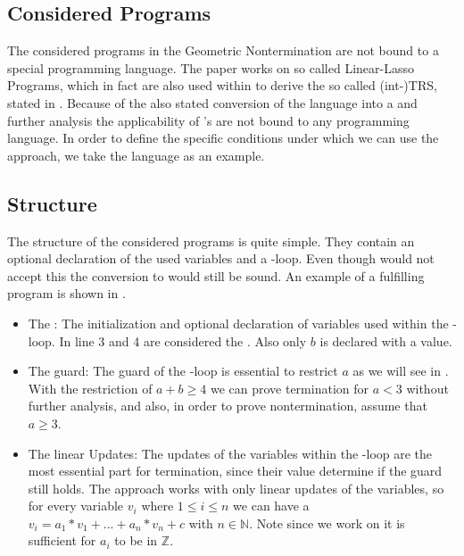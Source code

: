 \subsection{Considered Programs}
The considered programs in the Geometric Nontermination are not bound to a special programming language. The paper works on so called Linear-Lasso Programs, which in fact are also used within \aprove to derive the so called (int-)TRS, stated in . Because of the also stated conversion of the language into a \seg and further analysis the applicability of \gna's are not bound to any programming language. \newline
In order to define the specific conditions under which we can use the approach, we take the language  as an example.
\subsection{Structure}
\label{sec:structure}
The structure of the considered programs is quite simple. They contain an optional declaration of the used variables and a -loop. Even though  would not accept this the conversion to  would still be sound. An example of a fulfilling  program is shown in . 
\begin{itemize}
	\item The \stem: \newline
		The initialization and optional declaration of variables used within the -loop. In  line 3 and 4 are considered the \stem. Also only $b$ is declared with a value.
	\item The guard: \newline
		The guard of the -loop is essential to restrict $a$  as we will see in . With the restriction of $a+b\ge 4 $ we can prove termination for $a < 3$ without further analysis, and also, in order to prove nontermination, assume that $a \ge 3$.
	\item The linear Updates: \newline
		The updates of the variables within the -loop are the most essential part for termination, since their value determine if the guard still holds. The approach works with only linear updates of the variables, so for every variable $v_i$ where $1\le i\le n$ we can have a $v_i=a_1*v_1+...+a_n*v_n+c$ with $n \in \mathbb{N}$. Note since we work on \its it is sufficient for $a_i$ to be in $\mathbb{Z}$. 	
\end{itemize} 

